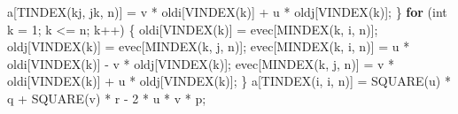 \documentclass[
  12pt,
  letterpaper,
  DIV=11,
  numbers=noendperiod]{scrreprt}
\newenvironment{Shaded}{\begin{snugshade}}{\end{snugshade}}
\newcommand{\ControlFlowTok}[1]{\textcolor[rgb]{0.00,0.23,0.31}{\textbf{#1}}}
\newcommand{\DataTypeTok}[1]{\textcolor[rgb]{0.68,0.00,0.00}{#1}}
\newcommand{\DecValTok}[1]{\textcolor[rgb]{0.68,0.00,0.00}{#1}}
\newcommand{\NormalTok}[1]{\textcolor[rgb]{0.00,0.23,0.31}{#1}}
\newcommand{\OperatorTok}[1]{\textcolor[rgb]{0.37,0.37,0.37}{#1}}
\theoremstyle{remark}
\begin{document}
\begin{Shaded}
\begin{Highlighting}[]
\NormalTok{                    a}\OperatorTok{[}\NormalTok{TINDEX}\OperatorTok{(}\NormalTok{kj}\OperatorTok{,}\NormalTok{ jk}\OperatorTok{,}\NormalTok{ n}\OperatorTok{)]} \OperatorTok{=}
\NormalTok{                        v }\OperatorTok{*}\NormalTok{ oldi}\OperatorTok{[}\NormalTok{VINDEX}\OperatorTok{(}\NormalTok{k}\OperatorTok{)]} \OperatorTok{+}\NormalTok{ u }\OperatorTok{*}\NormalTok{ oldj}\OperatorTok{[}\NormalTok{VINDEX}\OperatorTok{(}\NormalTok{k}\OperatorTok{)];}
                \OperatorTok{\}}
                \ControlFlowTok{for} \OperatorTok{(}\DataTypeTok{int}\NormalTok{ k }\OperatorTok{=} \DecValTok{1}\OperatorTok{;}\NormalTok{ k }\OperatorTok{\textless{}=}\NormalTok{ n}\OperatorTok{;}\NormalTok{ k}\OperatorTok{++)} \OperatorTok{\{}
\NormalTok{                    oldi}\OperatorTok{[}\NormalTok{VINDEX}\OperatorTok{(}\NormalTok{k}\OperatorTok{)]} \OperatorTok{=}\NormalTok{ evec}\OperatorTok{[}\NormalTok{MINDEX}\OperatorTok{(}\NormalTok{k}\OperatorTok{,}\NormalTok{ i}\OperatorTok{,}\NormalTok{ n}\OperatorTok{)];}
\NormalTok{                    oldj}\OperatorTok{[}\NormalTok{VINDEX}\OperatorTok{(}\NormalTok{k}\OperatorTok{)]} \OperatorTok{=}\NormalTok{ evec}\OperatorTok{[}\NormalTok{MINDEX}\OperatorTok{(}\NormalTok{k}\OperatorTok{,}\NormalTok{ j}\OperatorTok{,}\NormalTok{ n}\OperatorTok{)];}
\NormalTok{                    evec}\OperatorTok{[}\NormalTok{MINDEX}\OperatorTok{(}\NormalTok{k}\OperatorTok{,}\NormalTok{ i}\OperatorTok{,}\NormalTok{ n}\OperatorTok{)]} \OperatorTok{=}
\NormalTok{                        u }\OperatorTok{*}\NormalTok{ oldi}\OperatorTok{[}\NormalTok{VINDEX}\OperatorTok{(}\NormalTok{k}\OperatorTok{)]} \OperatorTok{{-}}\NormalTok{ v }\OperatorTok{*}\NormalTok{ oldj}\OperatorTok{[}\NormalTok{VINDEX}\OperatorTok{(}\NormalTok{k}\OperatorTok{)];}
\NormalTok{                    evec}\OperatorTok{[}\NormalTok{MINDEX}\OperatorTok{(}\NormalTok{k}\OperatorTok{,}\NormalTok{ j}\OperatorTok{,}\NormalTok{ n}\OperatorTok{)]} \OperatorTok{=}
\NormalTok{                        v }\OperatorTok{*}\NormalTok{ oldi}\OperatorTok{[}\NormalTok{VINDEX}\OperatorTok{(}\NormalTok{k}\OperatorTok{)]} \OperatorTok{+}\NormalTok{ u }\OperatorTok{*}\NormalTok{ oldj}\OperatorTok{[}\NormalTok{VINDEX}\OperatorTok{(}\NormalTok{k}\OperatorTok{)];}
                \OperatorTok{\}}
\NormalTok{                a}\OperatorTok{[}\NormalTok{TINDEX}\OperatorTok{(}\NormalTok{i}\OperatorTok{,}\NormalTok{ i}\OperatorTok{,}\NormalTok{ n}\OperatorTok{)]} \OperatorTok{=}
\NormalTok{                    SQUARE}\OperatorTok{(}\NormalTok{u}\OperatorTok{)} \OperatorTok{*}\NormalTok{ q }\OperatorTok{+}\NormalTok{ SQUARE}\OperatorTok{(}\NormalTok{v}\OperatorTok{)} \OperatorTok{*}\NormalTok{ r }\OperatorTok{{-}} \DecValTok{2} \OperatorTok{*}\NormalTok{ u }\OperatorTok{*}\NormalTok{ v }\OperatorTok{*}\NormalTok{ p}\OperatorTok{;}

\end{Highlighting}
\end{Shaded}
\end{document}

